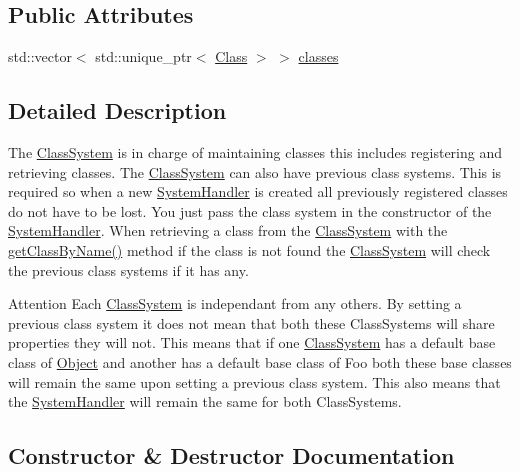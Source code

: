 \subsection*{Public Attributes}
\begin{DoxyCompactItemize}
\item 
std\+::vector$<$ std\+::unique\+\_\+ptr$<$ \hyperlink{classClass}{Class} $>$ $>$ \hyperlink{classClassSystem_afdfbb54eb10abf323371cb9bb4f639a2}{classes}
\end{DoxyCompactItemize}


\subsection{Detailed Description}
The \hyperlink{classClassSystem}{Class\+System} is in charge of maintaining classes this includes registering and retrieving classes. The \hyperlink{classClassSystem}{Class\+System} can also have previous class systems. This is required so when a new \hyperlink{classSystemHandler}{System\+Handler} is created all previously registered classes do not have to be lost. You just pass the class system in the constructor of the \hyperlink{classSystemHandler}{System\+Handler}. When retrieving a class from the \hyperlink{classClassSystem}{Class\+System} with the \hyperlink{classClassSystem_a4b88087eed035dc1f6100850c933ae84}{get\+Class\+By\+Name()} method if the class is not found the \hyperlink{classClassSystem}{Class\+System} will check the previous class systems if it has any. \begin{DoxyAttention}{Attention}
Each \hyperlink{classClassSystem}{Class\+System} is independant from any others. By setting a previous class system it does not mean that both these Class\+Systems will share properties they will not. This means that if one \hyperlink{classClassSystem}{Class\+System} has a default base class of \hyperlink{classObject}{Object} and another has a default base class of Foo both these base classes will remain the same upon setting a previous class system. This also means that the \hyperlink{classSystemHandler}{System\+Handler} will remain the same for both Class\+Systems. 
\end{DoxyAttention}


\subsection{Constructor \& Destructor Documentation}
\mbox{\label{classClassSystem_aaaec70fea8c72ed8c47bfb4de3fc4b46}} 
